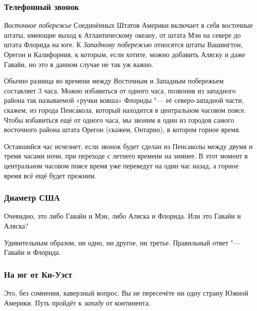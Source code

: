 \documentclass[twoside]{book}
\begin{document}
\subsubsection*{Телефонный звонок}%

\emph{Восточное побережье} Соединённых Штатов Америки включает в себя восточные штаты, имеющие выход к Атлантическому океану, от штата Мэн на севере до штата Флорида на юге.
К \emph{Западному побережью} относятся штаты Вашингтон, Орегон и Калифорния,
к которым, если хотите, можно добавить Аляску и даже Гавайи, но это в данном случае не так уж важно. %

Обычно разница во времени между Восточным и Западным побережьем составляет 3 часа.
Можно избавиться от одного часа, позвонив из западного района так называемой «ручки ковша» Флориды "--- её северо-западной части, %
скажем, из города Пенс\'{а}кола, который находится в центральном часовом поясе.
Чтобы избавиться ещё от одного часа, мы звоним в один из городов самого восточного района штата Орегон (скажем, Онтарио), в котором горное время.

Оставшийся час исчезнет, если звонок будет сделан из Пенсаколы между двумя и тремя часами ночи, при переходе с летнего времени на зимнее.
В этот момент в центральном часовом поясе время уже переведут на один час назад, а горное время всё ещё будет прежним.\heart 

       
                                  
\subsubsection*{Диаметр США}%

Очевидно, это либо Гавайи и Мэн, либо Аляска и Флорида.
Или это Гавайи и Аляска?

\medskip

Удивительным образом, ни одно, ни другое, ни третье.
Правильный ответ "--- Гавайи и Флорида.\heart

\subsubsection*{На юг от Ки-Уэст}%

Это, без сомнения, каверзный вопрос. %
Вы не пересечёте ни одну страну Южной Америки.
Путь пройдёт к \emph{западу} от континента.
\heart
\end{document}
